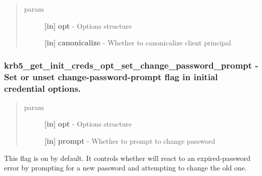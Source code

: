 \documentclass[letterpaper,10pt,english]{sphinxmanual}
\begin{document}
\begin{quote}\begin{description}
\item[{param}] \leavevmode
\textbf{{[}in{]}} \textbf{opt} - Options structure

\textbf{{[}in{]}} \textbf{canonicalize} - Whether to canonicalize client principal

\end{description}\end{quote}


\subsubsection{krb5\_get\_init\_creds\_opt\_set\_change\_password\_prompt -  Set or unset change-password-prompt flag in initial credential options.}
\label{appdev/refs/api/krb5_get_init_creds_opt_set_change_password_prompt::doc}\label{appdev/refs/api/krb5_get_init_creds_opt_set_change_password_prompt:krb5-get-init-creds-opt-set-change-password-prompt-set-or-unset-change-password-prompt-flag-in-initial-credential-options}

\begin{fulllineitems}
\label{appdev/refs/api/krb5_get_init_creds_opt_set_change_password_prompt:c.krb5_get_init_creds_opt_set_change_password_prompt}
\end{fulllineitems}

\begin{quote}\begin{description}
\item[{param}] \leavevmode
\textbf{{[}in{]}} \textbf{opt} - Options structure

\textbf{{[}in{]}} \textbf{prompt} - Whether to prompt to change password

\end{description}\end{quote}

This flag is on by default. It controls whether {\hyperref[appdev/refs/api/krb5_get_init_creds_password:c.krb5_get_init_creds_password]{}} will react to an expired-password error by prompting for a new password and attempting to change the old one.
\end{document}
